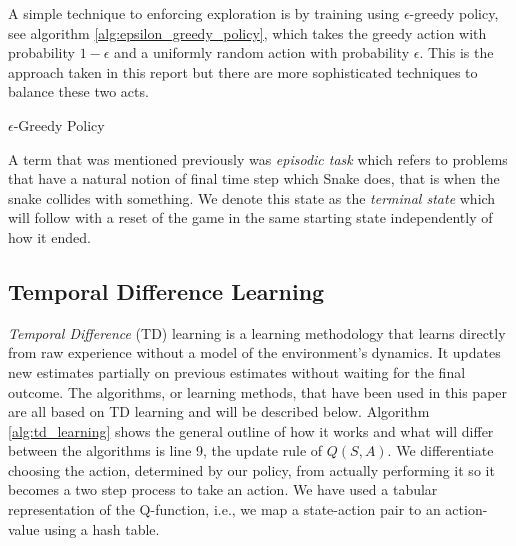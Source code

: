 \documentclass[result.tex]{subfiles}
\begin{document}
    A simple technique to enforcing exploration is by training using $\epsilon$-greedy policy, see algorithm \ref{alg:epsilon_greedy_policy}, which takes the greedy action with probability $1 - \epsilon$ and a uniformly random action with probability $\epsilon$. This is the approach taken in this report but there are more sophisticated techniques to balance these two acts.

    \begin{algorithm}[H]
        \begin{algorithmic}[1]
            \Statex
            \Else
            \EndIf
            \State
            \EndFunction
        \end{algorithmic}
        \caption{$\epsilon$-Greedy Policy}
        \label{alg:epsilon_greedy_policy}
    \end{algorithm}

    A term that was mentioned previously was \textit{episodic task} which refers to problems that have a natural notion of final time step which Snake does, that is when the snake collides with something. We denote this state as the \textit{terminal state} which will follow with a reset of the game in the same starting state independently of how it ended.
    
    \subsection*{Temporal Difference Learning}

    \textit{Temporal Difference} (TD) learning is a learning methodology that learns directly from raw experience without a model of the environment's dynamics. It updates new estimates partially on previous estimates without waiting for the final outcome. The algorithms, or learning methods, that have been used in this paper are all based on TD learning and will be described below. Algorithm \ref{alg:td_learning} shows the general outline of how it works and what will differ between the algorithms is line 9, the update rule of $Q(S, A)$. We differentiate choosing the action, determined by our policy, from actually performing it so it becomes a two step process to take an action. We have used a tabular representation of the Q-function, i.e., we map a state-action pair to an action-value using a hash table.
\end{document}
